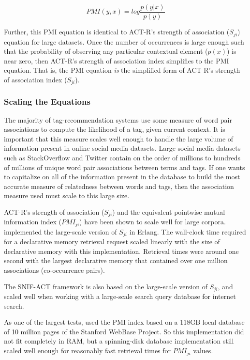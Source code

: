 \documentclass[man,floatsintext,donotrepeattitle]{apa6}
\begin{document}
\begin{equation}
  \label{eqPMI}
  \mathit{PMI}(y,x) = log \frac{p(y|x)}{p(y)}
\end{equation}

Further, this PMI equation is identical to ACT-R's strength of association ($S_{ji}$) equation for large datasets.
Once the number of occurrences is large enough such that the probability of observing any particular contextual element ($p(x)$) is near zero, then ACT-R's strength of association index simplifies to the PMI equation.
That is, the PMI equation \emph{is} the simplified form of ACT-R's strength of association index ($S_{ji}$).

\subsubsection{Scaling the Equations}

The majority of tag-recommendation systems use some measure of word pair associations to compute the likelihood of a tag, given current context.
It is important that this measure scales well enough to handle the large volume of information present in online social media datasets.
Large social media datasets such as StackOverflow and Twitter contain on the order of millions to hundreds of millions of unique word pair associations between terms and tags.
If one wants to capitalize on all of the information present in the database to build the most accurate measure of relatedness between words and tags, then the association measure used must scale to this large size.

ACT-R's strength of association ($S_{ji}$) and the equivalent pointwise mutual information index ($\mathit{PMI}_{ji}$) have been shown to scale well for large corpora.
\textcite{Douglass2010} implemented the large-scale version of $S_{ji}$ in Erlang.
The wall-clock time required for a declarative memory retrieval request scaled linearly with the size of declarative memory with this implementation.
Retrieval times were around one second with the largest declarative memory that contained over one million associations (co-occurrence pairs).

The SNIF-ACT framework \parencites{Fu2007,Pirolli2003} is also based on the large-scale version of $S_{ji}$, and scaled well when working with a large-scale search query database for internet search.

As one of the largest tests, \textcite{Farahat2004} used the PMI index based on a 118GB local database of 10 million pages of the Stanford WebBase Project.
So this implementation did not fit completely in RAM, but a spinning-disk database implementation still scaled well enough for reasonably fast retrieval times for $\mathit{PMI}_{ji}$ values.
\end{document}
